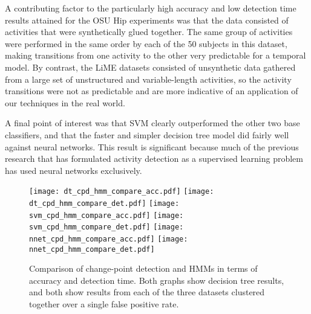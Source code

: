 A contributing factor to the particularly high accuracy and low detection time
results attained for the OSU Hip experiments was that the data consisted of
activities that were synthetically glued together. The same group of activities
were performed in the same order by each of the 50 subjects in this dataset,
making transitions from one activity to the other very predictable for a
temporal model. By contrast, the LiME datasets consisted of unsynthetic data
gathered from a large set of unstructured and variable-length activities,
so the activity transitions were not as predictable and are more indicative of
an application of our techniques in the real world.


A final point of interest was that SVM clearly outperformed the other two
base classifiers, and that the faster and simpler decision tree model did fairly
well against neural networks. This result is significant because much of the
previous research that has formulated activity detection as a supervised learning
problem has used neural networks exclusively.

\begin{figure}[h]
 \centering
 \texttt{[image: dt\_cpd\_hmm\_compare\_acc.pdf]} \hspace{1em}\vspace{1em}
 \texttt{[image: dt\_cpd\_hmm\_compare\_det.pdf]} 
 \texttt{[image: svm\_cpd\_hmm\_compare\_acc.pdf]} \hspace{1em}\vspace{1em}
 \texttt{[image: svm\_cpd\_hmm\_compare\_det.pdf]}
 \texttt{[image: nnet\_cpd\_hmm\_compare\_acc.pdf]} \hspace{1em}
 \texttt{[image: nnet\_cpd\_hmm\_compare\_det.pdf]}
 \caption{Comparison of change-point detection and HMMs in terms of accuracy
  and detection time. Both
  graphs show decision tree results, and both show results from each of the
  three datasets clustered together over a single false positive rate.}
 \label{fig:compare_cpd_hmm}
\end{figure}
